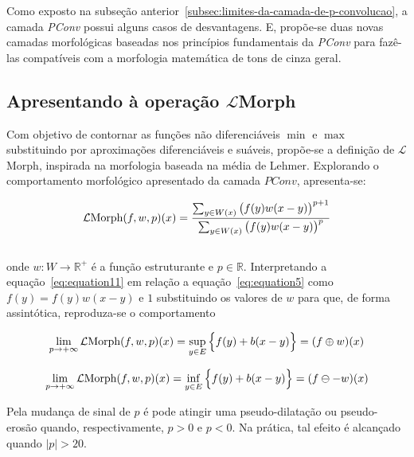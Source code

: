 Como exposto na subseção anterior~\ref{subsec:limites-da-camada-de-p-convolucao}, a camada \emph{PConv} possui alguns casos de desvantagens.
E, propõe-se duas novas camadas morfológicas baseadas nos princípios fundamentais da \emph{PConv} para fazê-las compatíveis com a morfologia matemática de tons de cinza geral.

\subsection{Apresentando à operação $\mathcal{L}$Morph}
\label{subsec:introduzindo-a-operacao-lmorph}

Com objetivo de contornar as funções não diferenciáveis $\min$ e $\max$ substituindo por aproximações diferenciáveis e suáveis, propõe-se a definição de $\mathcal{L}$Morph, inspirada na morfologia baseada na média de Lehmer.
Explorando o comportamento morfológico apresentado da camada $PConv$, apresenta-se:

\begin{equation}
    \mathcal{L}\text{Morph}(f, w, p)(x) =
    \frac{\sum_{y \in W(x)} \big{(}f(y)w(x-y)\big{)}^{p+1}}{\sum_{y \in W(x)} \big{(}f(y)w(x-y)\big{)}^{p}}
    \label{eq:equation11}
\end{equation}
\\
onde $w: W \to \mathbb{R}^{+}$ é a função estruturante e $p \in \mathbb{R}$.
Interpretando a equação~\ref{eq:equation11} em relação a equação~\ref{eq:equation5} como $f(y) = f(y)w(x-y)$ e $1$ substituindo os valores de $w$ para que, de forma assintótica, reproduza-se o comportamento

\begin{equation}
    \lim_{p \to +\infty} \mathcal{L}\text{Morph}(f, w, p)(x) =
    \sup_{y \in E}\Big{\{} f(y) + b(x - y)\Big{\}} = (f \oplus w)(x)
    \label{eq:equation12}
\end{equation}

\begin{equation}
    \lim_{p \to +\infty} \mathcal{L}\text{Morph}(f, w, p)(x) =
    \inf_{y \in E}\Big{\{} f(y) + b(x - y)\Big{\}} = (f \ominus -w)(x)
    \label{eq:equation13}
\end{equation}

Pela mudança de sinal de $p$ é pode atingir uma pseudo-dilatação ou pseudo-erosão quando, respectivamente, $p > 0$ e $p < 0$.
Na prática, tal efeito é alcançado quando $|p| > 20$.


